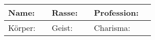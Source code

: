 \documentclass[oneside,a4paper]{minimal}
\begin{document}
\begin{tabular}{| l l | l l | l l |}
\hline
Name:&\hspace{150pt} &Rasse:&\hspace{150pt} &Profession:&\hspace{100pt}\\[5pt]\hline
Körper:&\hspace{50pt} &Geist:&\hspace{50pt}&Charisma:&\hspace{50pt}\\\hline

\end{tabular}
\end{document}
